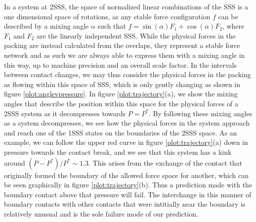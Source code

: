 In a system at 2SSS, the space of normalized linear combinations of the SSS is a one dimensional space of rotations, as any stable force configuration $f$ can be described by a mixing angle $\alpha$ such that $f = \sin(\alpha) F_1 + \cos(\alpha) F_2$, where $F_1$ and $F_2$ are the linearly independent SSS. While the physical forces in the packing are instead calculated from the overlaps, they represent a stable force network and as such we are always able to express them with a mixing angle in this way, up to machine precision and an overall scale factor. In the intervals between contact changes, we may thus consider the physical forces in the packing as flowing within this space of SSS, which is only gently changing as shown in figure \ref{plot:anglevpressure}. In figure \ref{plot:trajectory}(a), we show the mixing angles that describe the position within this space for the physical forces of a 2SSS system as it decompresses towards $P=P^*$. By following these mixing angles as a system decompresses, we see how the physical forces in the system approach and reach one of the 1SSS states on the boundaries of the 2SSS space. As an example, we can follow the upper red curve in figure \ref{plot:trajectory}(a) down in pressure towards the contact break, and we see that this system has a kink around $(P-P^*)/P^* \sim 1.3$. This arises from the exchange of the contact that originally formed the boundary of the allowed force space for another, which can be seen graphically in figure \ref{plot:trajectory}(b). Thus a prediction made with the boundary contact above that pressure will fail. The interchange in this manner of boundary contacts with other contacts that were intitially near the boundary is relatively unusual and is the sole failure mode of our prediction.


